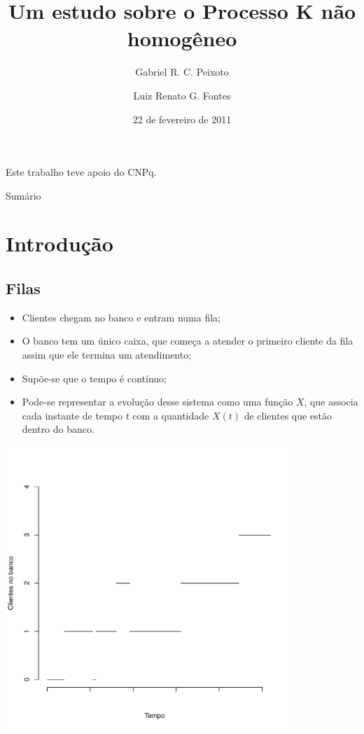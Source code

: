 \documentclass[xcolor=pdftex,dvipsnames]{beamer}
\title{Um estudo sobre o Processo K não homogêneo}
\author[Peixoto, G. R. C. \and Fontes L. R. G.]
{Gabriel R. C. Peixoto \and Luiz Renato G. Fontes}
\institute[IME-USP]{Instituto de Matemática e Estatística da
  Universidade de São Paulo}
\date{22 de fevereiro de 2011}
\begin{document}
\begin{frame}[plain]
  \titlepage
  
  \begin{center}
    Este trabalho teve apoio do CNPq.
  \end{center}
\end{frame}


\begin{frame}[plain]{Sumário}
  \tableofcontents
\end{frame}

\section{Introdução}

\subsection*{Filas}

\begin{frame}

  \begin{itemize}
  \item Clientes chegam no banco e entram numa fila;
  \item O banco tem um único caixa, que começa a atender o primeiro
    cliente da fila assim que ele termina um atendimento;
  \item Supõe-se que o tempo é contínuo;
  \item Pode-se representar a evolução desse sistema como uma função
    $X$, que associa cada instante de tempo $t$ com a quantidade
    $X(t)$ de clientes que estão dentro do banco.
  \end{itemize}
\end{frame}

\begin{frame}
  \begin{center}
    \includegraphics[width=0.8\textwidth,trim=0cm 0cm 0cm
    1.5cm]{fila.pdf}
  \end{center}
\end{frame}
\end{document}
